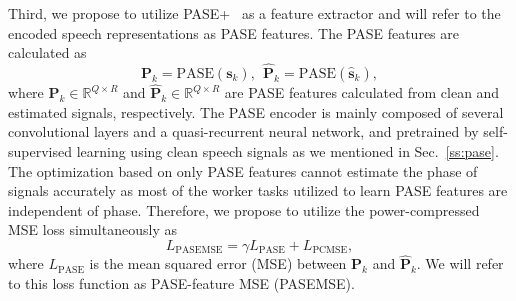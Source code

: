 \documentclass[a4paper]{article}
\begin{document}
\begin{spacing}{0.92}
Third, we propose to utilize PASE+~\cite{ravanelli2020multi} as a feature extractor and will refer to the encoded speech representations as PASE features.  The PASE features are calculated as
\begin{equation}
\mathbf{P}_k = \text{PASE}(\mathbf{s}_k),~~
\hat{\mathbf{P}}_k = \text{PASE}(\mathbf{\hat{s}}_k),
\label{eq:pase}
\end{equation}
where $\mathbf{P}_k\in \mathbb{R}^{Q\times R}$ and
$\hat{\mathbf{P}}_k\in \mathbb{R}^{Q\times R}$
are PASE features calculated from clean and estimated signals, respectively. The PASE encoder is mainly composed of several convolutional layers and a quasi-recurrent neural network,
and pretrained by self-supervised learning using clean speech signals as we mentioned in Sec.~\ref{ss:pase}. 
The optimization based on only PASE features cannot estimate the phase of signals accurately as  most of the worker tasks utilized to learn PASE features are independent of phase.
Therefore, we propose to utilize the power-compressed MSE loss simultaneously as
\begin{equation}
L_{\text{PASEMSE}} = \gamma L_{\text{PASE}} + L_{\text{PCMSE}},
\label{eq:pasemse_loss}
\end{equation}
where $L_{\text{PASE}}$ is the mean squared error (MSE) between $\mathbf{P}_k$ and $\hat{\mathbf{P}}_k$.
We will refer to this loss function as PASE-feature MSE (PASEMSE).

\end{spacing}
\end{document}
